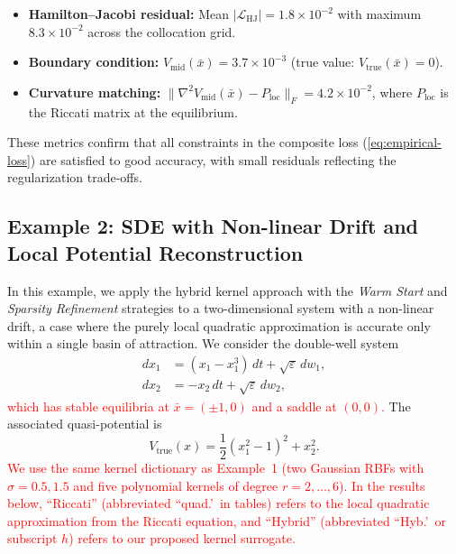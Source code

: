 \documentclass[11pt]{article}
\theoremstyle{plain}      %
\theoremstyle{definition} %
\begin{document}
\begin{itemize}
\item \textbf{Hamilton--Jacobi residual:} Mean $|\mathcal{L}_{\text{HJ}}| = 1.8 \times 10^{-2}$ with maximum $8.3 \times 10^{-2}$ across the collocation grid.

\item \textbf{Boundary condition:} $V_{\text{mid}}(\bar{x}) = 3.7 \times 10^{-3}$ (true value: $V_{\text{true}}(\bar{x}) = 0$).

\item \textbf{Curvature matching:} $\|\nabla^2 V_{\text{mid}}(\bar{x}) - P_{\text{loc}}\|_F = 4.2 \times 10^{-2}$, where $P_{\text{loc}}$ is the Riccati matrix at the equilibrium.
\end{itemize}

These metrics confirm that all constraints in the composite loss (\ref{eq:empirical-loss}) are satisfied to good accuracy, with small residuals reflecting the regularization trade-offs.


\subsection{Example 2: SDE with Non-linear Drift and Local Potential Reconstruction}
\label{sec:example2_kernels}

In this example, we apply the hybrid kernel approach with the \emph{Warm Start}
and \emph{Sparsity Refinement} strategies to a two-dimensional system with a
non-linear drift, a case where the purely local quadratic approximation is
accurate only within a single basin of attraction. We consider the double-well
system
\begin{equation}\label{sde2}
\begin{aligned}
    dx_1 &= (x_1 - x_1^3)\, dt + \sqrt{\varepsilon}\, dw_1, \\
    dx_2 &= -x_2\, dt + \sqrt{\varepsilon}\, dw_2 ,
\end{aligned}
\end{equation}
\textcolor{red}{which has stable equilibria at $\bar{x}=(\pm 1, 0)$ and a saddle at $(0,0)$.} The associated quasi-potential is
\[
V_{\text{true}}(x)
= \frac{1}{2} (x_1^2 - 1)^2 + x_2^2.
\]
\textcolor{red}{We use the same kernel dictionary as Example~1 (two Gaussian RBFs with $\sigma=0.5,1.5$ and five polynomial kernels of degree $r=2,\ldots,6$). In the results below, ``Riccati'' (abbreviated ``quad.'\ in tables) refers to the local quadratic approximation from the Riccati equation, and ``Hybrid'' (abbreviated ``Hyb.'\ or subscript $h$) refers to our proposed kernel surrogate.}
\end{document}
